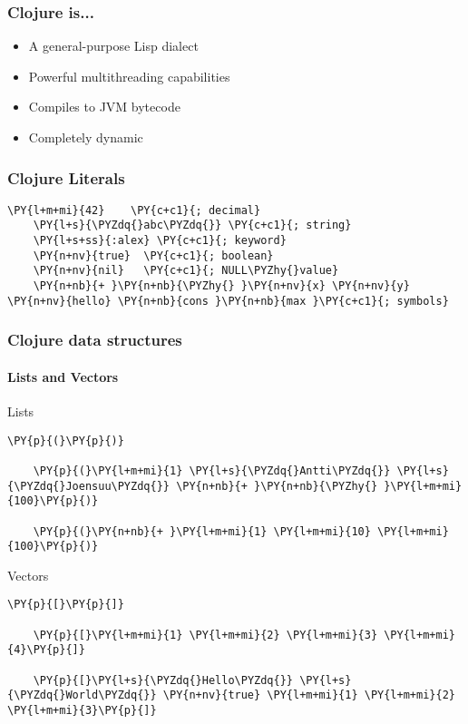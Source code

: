\begin{frame}
  \frametitle{Clojure is...}


  \begin{itemize}[<+->]
    \item<1-> A general-purpose Lisp dialect
    \item<2-> Powerful multithreading capabilities
    \item<3-> Compiles to JVM bytecode
    \item<4-> Completely dynamic
  \end{itemize}
\end{frame}


\begin{frame}[fragile]
  \frametitle{Clojure Literals}
  \begin{Verbatim}[commandchars=\\\{\}]
    \PY{l+m+mi}{42}    \PY{c+c1}{; decimal}
    \PY{l+s}{\PYZdq{}abc\PYZdq{}} \PY{c+c1}{; string}
    \PY{l+s+ss}{:alex} \PY{c+c1}{; keyword}
    \PY{n+nv}{true}  \PY{c+c1}{; boolean}
    \PY{n+nv}{nil}   \PY{c+c1}{; NULL\PYZhy{}value}
    \PY{n+nb}{+ }\PY{n+nb}{\PYZhy{} }\PY{n+nv}{x} \PY{n+nv}{y} \PY{n+nv}{hello} \PY{n+nb}{cons }\PY{n+nb}{max }\PY{c+c1}{; symbols}
  \end{Verbatim}
\end{frame}


\begin{frame}[fragile]
  \frametitle{Clojure data structures}
  \framesubtitle{Lists and Vectors}

  \begin{block}{Lists}
  \begin{Verbatim}[commandchars=\\\{\}]
    \PY{p}{(}\PY{p}{)}

    \PY{p}{(}\PY{l+m+mi}{1} \PY{l+s}{\PYZdq{}Antti\PYZdq{}} \PY{l+s}{\PYZdq{}Joensuu\PYZdq{}} \PY{n+nb}{+ }\PY{n+nb}{\PYZhy{} }\PY{l+m+mi}{100}\PY{p}{)}

    \PY{p}{(}\PY{n+nb}{+ }\PY{l+m+mi}{1} \PY{l+m+mi}{10} \PY{l+m+mi}{100}\PY{p}{)}
  \end{Verbatim}
  \end{block}

  \begin{block}{Vectors}
  \begin{Verbatim}[commandchars=\\\{\}]
    \PY{p}{[}\PY{p}{]}

    \PY{p}{[}\PY{l+m+mi}{1} \PY{l+m+mi}{2} \PY{l+m+mi}{3} \PY{l+m+mi}{4}\PY{p}{]}

    \PY{p}{[}\PY{l+s}{\PYZdq{}Hello\PYZdq{}} \PY{l+s}{\PYZdq{}World\PYZdq{}} \PY{n+nv}{true} \PY{l+m+mi}{1} \PY{l+m+mi}{2} \PY{l+m+mi}{3}\PY{p}{]}
  \end{Verbatim}
  \end{block}
\end{frame}


